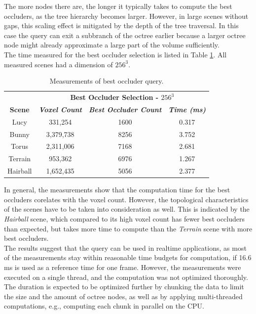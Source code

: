 \documentclass[conference]{IEEEtran}
\begin{document}
\noindent
The more nodes there are, the longer it typically takes to compute the best occluders, as the tree 
hierarchy becomes larger. However, in large scenes without gaps, this scaling effect is mitigated 
by the depth of the tree traversal. In this case the query can exit a subbranch of the octree 
earlier because a larger octree node might already approximate a large part of the volume sufficiently. \\

\noindent
The time measured for the best occluder selection is listed in Table \ref{tab:best-occluder-query}. 
All measured scenes had a dimension of $256^3$.

\begin{table}[htbp]
    \caption{Measurements of best occluder query.}
    \begin{center}
        \begin{tabular}{|c|c|c|c|}
            \hline
            \textbf{}&\multicolumn{3}{|c|}{\textbf{Best Occluder Selection - $256^3$}} \\
            \cline{2-4} 
            \textbf{Scene} & \textbf{\textit{Voxel Count}}& \textbf{\textit{Best Occluder Count}}& \textbf{\textit{Time (ms)}} \\
            \hline
            Lucy        & 331,254   & 1600 & 0.317 \\
            Bunny       & 3,379,738 & 8256 & 3.752 \\
            Torus       & 2,311,006 & 7168 & 2.681 \\
            Terrain     & 953,362   & 6976 & 1.267 \\
            Hairball    & 1,652,435 & 5056 & 2.377 \\
            \hline
        \end{tabular}
    \label{tab:best-occluder-query}
    \end{center}
\end{table}

\noindent
In general, the measurements show that the computation time for the best occluders corelates with the voxel count.
However, the topological characteristics of the scenes have to be taken into consideration as well. This is 
indicated by the \emph{Hairball} scene, which compared to its high voxel count has fewer best occluders than 
expected, but takes more time to compute than the \emph{Terrain} scene with more best occluders. \\

\noindent
The results suggest that the query can be used in realtime applications, as most of the measurements stay 
within reasonable time budgets for computation, if 16.6 ms is used as a reference time for one frame. However, 
the measurements were executed on a single thread, and the computation was not optimized thoroughly. The 
duration is expected to be optimized further by chunking the data to limit the size and the amount of octree 
nodes, as well as by applying multi-threaded computations, e.g., computing each chunk in parallel on the \ac{CPU}.
\end{document}
